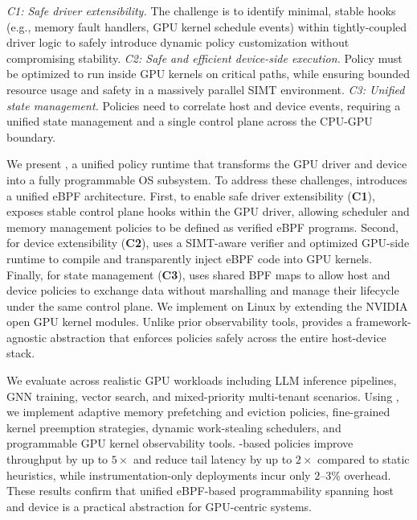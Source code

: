 \emph{C1: Safe driver extensibility.} The challenge is to identify minimal, stable hooks (e.g., memory fault handlers, GPU kernel schedule events) within tightly-coupled driver logic to safely introduce dynamic policy customization without compromising stability. \emph{C2: Safe and efficient device-side execution.} Policy must be optimized to run inside GPU kernels on critical paths, while ensuring bounded resource usage and safety in a massively parallel SIMT environment. \emph{C3: Unified state management.} Policies need to correlate host and device events, requiring a unified state management and a single control plane across the CPU-GPU boundary.

We present \sys, a unified policy runtime that transforms the GPU driver and device into a fully programmable OS subsystem. To address these challenges, \sys introduces a unified eBPF architecture. First, to enable safe driver extensibility (\textbf{C1}), \sys exposes stable control plane hooks within the GPU driver, allowing scheduler and memory management policies to be defined as verified eBPF programs. Second, for device extensibility (\textbf{C2}), \sys uses a SIMT-aware verifier and optimized GPU-side runtime to compile and transparently inject eBPF code into GPU kernels. Finally, for state management (\textbf{C3}), \sys uses shared BPF maps to allow host and device policies to exchange data without marshalling and manage their lifecycle under the same control plane. We implement \sys on Linux by extending the NVIDIA open GPU kernel modules\cite{nvidia-open-gpu}. Unlike prior observability tools\cite{cupti,villa2019nvbit,neutrino,egpu}, \sys provides a framework-agnostic abstraction that enforces policies safely across the entire host-device stack.

We evaluate \sys across realistic GPU workloads including LLM inference pipelines, GNN training, vector search, and mixed-priority multi-tenant scenarios. Using \sys, we implement adaptive memory prefetching and eviction policies, fine-grained kernel preemption strategies, dynamic work-stealing schedulers, and programmable GPU kernel observability tools. \sys-based policies improve throughput by up to $5\times$ and reduce tail latency by up to $2\times$ compared to static heuristics, while instrumentation-only deployments incur only $2$--$3\%$ overhead. These results confirm that unified eBPF-based programmability spanning host and device is a practical abstraction for GPU-centric systems.

